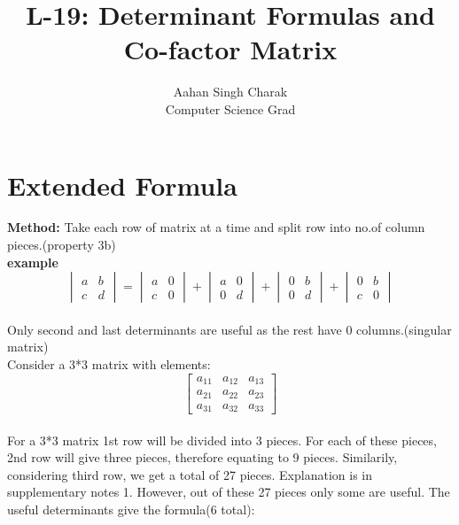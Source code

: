 \documentclass[]{article}
\title{L-19: Determinant Formulas and Co-factor Matrix}
\author{Aahan Singh Charak\\Computer Science Grad}
\begin{document}
	\maketitle
	\section{Extended Formula}
	\vspace{10pt}
	
	\textbf{Method:} Take each row of matrix at a time and split row into no.of column pieces.(property 3b)\\
	
	\noindent
	\textbf{example} \\
	
	\[
	\begin{vmatrix}
		a&b\\
		c&d
	\end{vmatrix}=\begin{vmatrix}
	a&0\\
	c&0
\end{vmatrix}+ \begin{vmatrix}
a&0\\
0&d
\end{vmatrix} + \begin{vmatrix}
0&b\\
0&d
\end{vmatrix} + \begin{vmatrix}
0&b\\
c&0
\end{vmatrix}
	\]\\
	
	\noindent
	Only second and last determinants are useful as the rest have 0 columns.(singular matrix)\\
	
	\noindent
	Consider a 3*3 matrix with elements:\\
	
	\[
	\begin{bmatrix}
		a_{11} & a_{12} & a_{13}\\
		a_{21} & a_{22} & a_{23}\\
		a_{31} & a_{32} & a_{33}
	\end{bmatrix}
	\]\\
	
	
	\noindent
	For a 3*3 matrix 1st row will be divided into 3 pieces. For each of these pieces, 2nd row will give three pieces, therefore equating to 9 pieces. Similarily, considering third row, we get a total of 27 pieces. Explanation is in supplementary notes 1. However, out of these 27 pieces only some are useful. The useful determinants give the formula(6 total):\\
	
\end{document}
